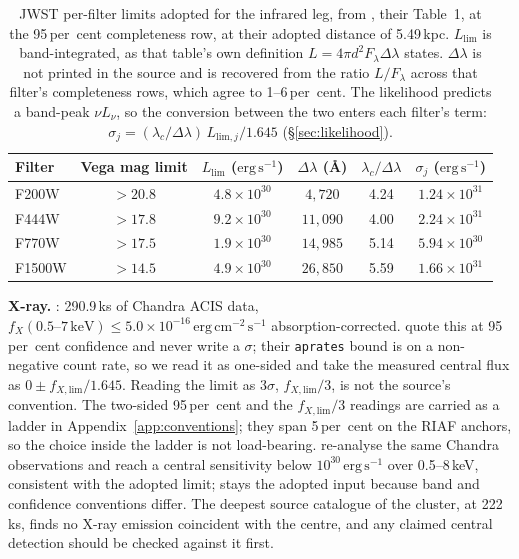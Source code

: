 \documentclass[11pt]{article}
\begin{document}
\begin{table}[tbp]
\centering
\small
\caption{JWST per-filter limits adopted for the infrared leg, from \citet{Chen2025JWST}, their Table~1, at the 95\,per~cent completeness row, at their adopted distance of 5.49\,kpc. $L_{\mathrm{lim}}$ is band-integrated, as that table's own definition $L = 4\pi d^{2} F_{\lambda}\Delta\lambda$ states. $\Delta\lambda$ is not printed in the source and is recovered from the ratio $L/F_{\lambda}$ across that filter's completeness rows, which agree to 1--6\,per~cent. The likelihood predicts a band-peak $\nu L_{\nu}$, so the conversion between the two enters each filter's term: $\sigma_{j} = (\lambda_{c}/\Delta\lambda)\,L_{\mathrm{lim},j}/1.645$ (\S\ref{sec:likelihood}).}
\label{tab:irfilters}
\begin{tabular}{lccccc}
\toprule
Filter & Vega mag limit & $L_{\mathrm{lim}}$ ($\mathrm{erg\,s^{-1}}$) & $\Delta\lambda$ (\AA) & $\lambda_{c}/\Delta\lambda$ & $\sigma_{j}$ ($\mathrm{erg\,s^{-1}}$) \\
\midrule
F200W  & $>20.8$ & $4.8\times10^{30}$ & $4{,}720$ & 4.24 & $1.24\times10^{31}$ \\
F444W  & $>17.8$ & $9.2\times10^{30}$ & $11{,}090$ & 4.00 & $2.24\times10^{31}$ \\
F770W  & $>17.5$ & $1.9\times10^{30}$ & $14{,}985$ & 5.14 & $5.94\times10^{30}$ \\
F1500W & $>14.5$ & $4.9\times10^{30}$ & $26{,}850$ & 5.59 & $1.66\times10^{31}$ \\
\bottomrule
\end{tabular}
\end{table}

\begin{sloppypar}
\textbf{X-ray.} \citet{Haggard2013}: 290.9\,ks of Chandra ACIS data, $f_X(0.5\text{--}7\,\mathrm{keV}) \leq 5.0\times10^{-16}\,\mathrm{erg\,cm^{-2}\,s^{-1}}$ absorption-corrected. \citet{Haggard2013} quote this at 95\,per~cent confidence and never write a $\sigma$; their \texttt{aprates} bound is on a non-negative count rate, so we read it as one-sided and take the measured central flux as $0 \pm f_{X,\mathrm{lim}}/1.645$. Reading the limit as $3\sigma$, $f_{X,\mathrm{lim}}/3$, is not the source's convention. The two-sided 95\,per~cent and the $f_{X,\mathrm{lim}}/3$ readings are carried as a ladder in Appendix~\ref{app:conventions}; they span 5\,per~cent on the RIAF anchors, so the choice inside the ladder is not load-bearing. \citet{Su2022} re-analyse the same Chandra observations and reach a central sensitivity below $10^{30}\,\mathrm{erg\,s^{-1}}$ over 0.5--8\,keV, consistent with the adopted limit; \citet{Haggard2013} stays the adopted input because band and confidence conventions differ. The deepest source catalogue of the cluster, \citet{Henleywillis2018} at 222\,ks, finds no X-ray emission coincident with the centre, and any claimed central detection should be checked against it first.
\end{sloppypar}
\end{document}
